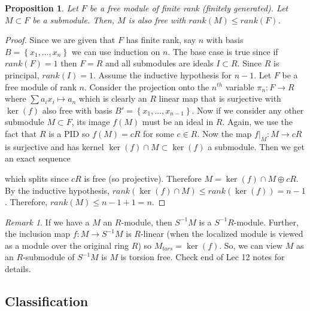 \documentclass{article}
\theoremstyle{definition}
\theoremstyle{remark}
\newtheorem*{remark}{Remark}
\theoremstyle{plain}
\newtheorem{prop}{Proposition}[subsection]
\begin{document}
\begin{prop}
    Let \(F\) be a free module of finite rank (finitely generated). Let \(M \subset F\) be a submodule. Then, \(M\) is also free with \(rank(M) \leq rank(F)\).
\end{prop}
\begin{proof}
    Since we are given that \(F\) has finite rank, say \(n\) with basis \(B = \left\{ x_1, \ldots, x_n \right\}\) we can use induction on \(n\).
    The base case is true since if \(rank(F) = 1\) then \(F = R\) and all submodules are ideals \(I \subset R\). Since \(R\) is principal, \(rank(I) = 1\).
    Assume the inductive hypothesis for \(n-1\). Let \(F\) be a free module of rank \(n\).
    Consider the projection onto the \(n^{th}\) variable \(\pi_n: F \to R\) where \(\sum a_ix_i \mapsto a_n\) which is clearly an \(R\) linear map that is surjective with \(\ker(f)\)
    also free with basis \(B' = \left\{ x_1, \ldots, x_{n-1} \right\}\). Now if we consider any other submodule \(M \subset F\), its image \(f(M)\) must be an ideal in \(R\). Again, we use
    the fact that \(R\) is a PID so \(f(M) = cR\) for some \(c\in R\). Now the map \(f|_M: M \to cR\) is surjective and has kernel \(\ker(f)\cap M \subset \ker(f)\) a submodule. Then we get an exact sequence
    which splits since \(cR\) is free (so projective). Therefore \(M = \ker(f)\cap M \oplus cR\). By the inductive hypothesis, \(rank(\ker(f)\cap M) \leq rank(\ker(f)) = n-1\). Therefore, 
    \(rank(M) \leq n-1 + 1 = n\).
\end{proof}

\begin{remark}
    If we have a \(M\) an \(R\)-module, then \(S^{-1}M\) is a \(S^{-1}R\)-module. Further, the inclusion map \(f: M \to S^{-1}M\) is \(R\)-linear (when the localized module is viewed as
    a module over the original ring \(R\)) so \(M_{tors} = \ker(f)\). So, we can view \(M\) as an \(R\)-submodule of \(S^{-1}M\) is \(M\) is torsion free. Check end of Lec 12 notes for details. 
\end{remark}

\subsection{Classification}
\end{document}
